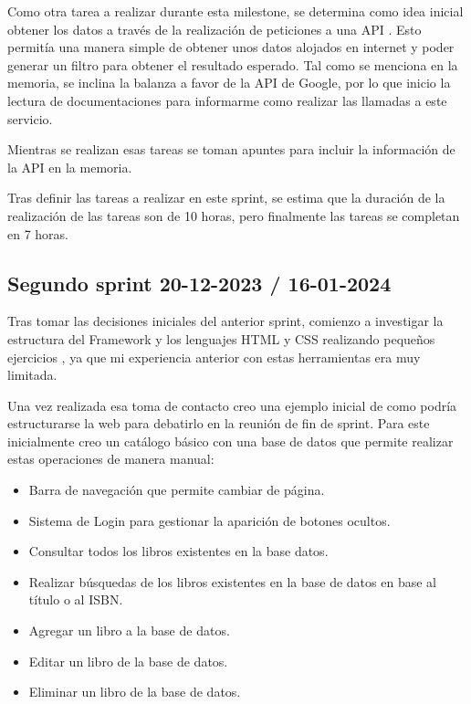 Como otra tarea a realizar durante esta milestone, se determina como idea inicial obtener los datos a través de la realización de peticiones a una API . Esto permitía una manera simple de obtener unos datos alojados en internet y poder generar un filtro  para obtener el resultado esperado.
Tal como se menciona en la memoria, se inclina la balanza a favor de la API de Google, por lo que inicio la lectura de documentaciones para informarme como realizar las llamadas a este servicio.

Mientras se realizan esas tareas se toman apuntes para incluir la información de la API en la memoria.

Tras definir las tareas a realizar en este sprint, se estima que la duración de la realización de las tareas son de 10 horas, pero finalmente las tareas se completan en 7 horas.

\subsection{Segundo sprint 20-12-2023 / 16-01-2024}

Tras tomar las decisiones iniciales del anterior sprint, comienzo a investigar la estructura del Framework y los lenguajes HTML y CSS realizando pequeños ejercicios , ya que mi experiencia anterior con estas herramientas era muy limitada.

Una vez realizada esa toma de contacto  creo una ejemplo inicial de como podría estructurarse la web para debatirlo en la reunión de fin de sprint.
Para este inicialmente creo un catálogo básico  con una base de datos que permite realizar estas operaciones de manera manual:

\begin{itemize}
    \item Barra de navegación que permite cambiar de página.
    \item Sistema de Login para gestionar la aparición de botones ocultos.
    \item Consultar todos los libros existentes en la base datos.
    \item Realizar búsquedas de los libros existentes en la base de datos en base al título o al ISBN.
    \item Agregar un libro a la base de datos.
    \item Editar un libro de la base de datos.
    \item Eliminar un libro de la base de datos.

\end{itemize}

